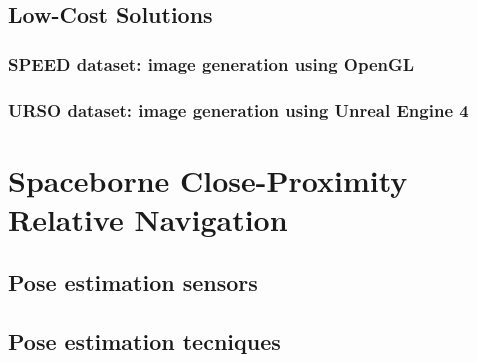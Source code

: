 \subsection{Low-Cost Solutions}

\subsubsection{SPEED dataset: image generation using OpenGL}

\subsubsection{URSO dataset: image generation using Unreal Engine 4}

\section{Spaceborne Close-Proximity Relative Navigation}

\subsection{Pose estimation sensors}

\subsection{Pose estimation tecniques}


